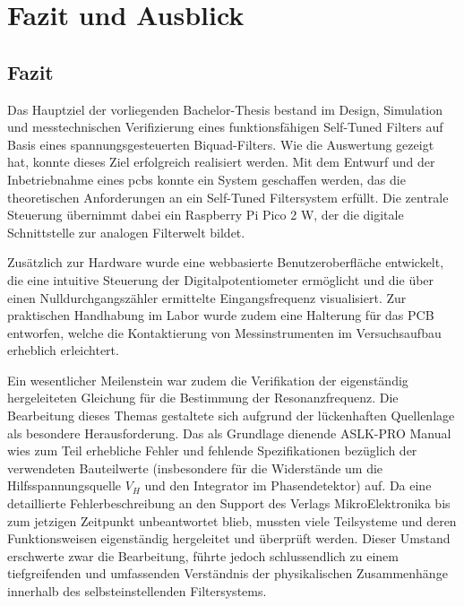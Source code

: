 \documentclass[../main_config.tex]{subfiles}
\begin{document}
\chapter{Fazit und Ausblick}


\section{Fazit}
Das Hauptziel der vorliegenden Bachelor-Thesis bestand im Design, Simulation und messtechnischen Verifizierung eines funktionsfähigen Self-Tuned Filters auf Basis eines spannungsgesteuerten Biquad-Filters. Wie die Auswertung gezeigt hat, konnte dieses Ziel erfolgreich realisiert werden. Mit dem Entwurf und der Inbetriebnahme eines \glspl{pcb} konnte ein System geschaffen werden, das die theoretischen Anforderungen an ein Self-Tuned Filtersystem erfüllt. Die zentrale Steuerung übernimmt dabei ein Raspberry Pi Pico 2 W, der die digitale Schnittstelle zur analogen Filterwelt bildet.\par
\medskip

Zusätzlich zur Hardware wurde eine webbasierte Benutzeroberfläche entwickelt, die eine intuitive Steuerung der Digitalpotentiometer ermöglicht und die über einen Nulldurchgangszähler ermittelte Eingangsfrequenz visualisiert. Zur praktischen Handhabung im Labor wurde zudem eine  Halterung für das PCB entworfen, welche die Kontaktierung von Messinstrumenten im Versuchsaufbau erheblich erleichtert.\par
\medskip

Ein wesentlicher Meilenstein war zudem die Verifikation der eigenständig hergeleiteten Gleichung für die Bestimmung der Resonanzfrequenz. Die Bearbeitung dieses Themas gestaltete sich aufgrund der lückenhaften Quellenlage als besondere Herausforderung. Das als Grundlage dienende ASLK-PRO Manual wies zum Teil erhebliche Fehler und fehlende Spezifikationen bezüglich der verwendeten Bauteilwerte (insbesondere für die Widerstände um die Hilfsspannungsquelle $V_H$ und den Integrator im Phasendetektor) auf. Da eine detaillierte Fehlerbeschreibung an den Support des Verlags MikroElektronika bis zum jetzigen Zeitpunkt unbeantwortet blieb, mussten viele Teilsysteme und deren Funktionsweisen eigenständig hergeleitet und überprüft werden. Dieser Umstand erschwerte zwar die Bearbeitung, führte jedoch schlussendlich zu einem tiefgreifenden und umfassenden Verständnis der physikalischen Zusammenhänge innerhalb des selbsteinstellenden Filtersystems.\par
\medskip
\end{document}
